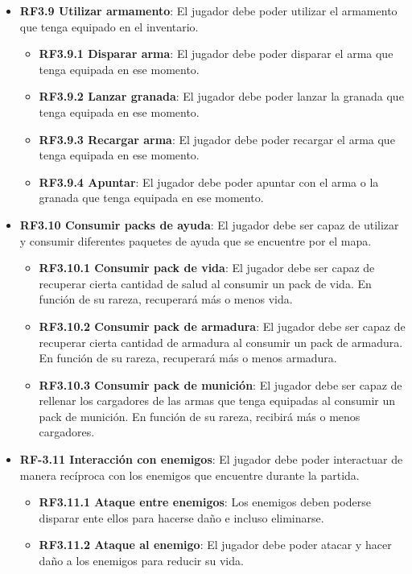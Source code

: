 \begin{itemize}
\begin{itemize}
        \item \textbf{RF3.9 Utilizar armamento}: El jugador debe poder utilizar el armamento que tenga equipado en el inventario.
        \begin{itemize}
            \item \textbf{RF3.9.1 Disparar arma}: El jugador debe poder disparar el arma que tenga equipada en ese momento.
            \item \textbf{RF3.9.2 Lanzar granada}: El jugador debe poder lanzar la granada que tenga equipada en ese momento.
            \item \textbf{RF3.9.3 Recargar arma}: El jugador debe poder recargar el arma que tenga equipada en ese momento.
            \item \textbf{RF3.9.4 Apuntar}: El jugador debe poder apuntar con el arma o la granada que tenga equipada en ese momento.
        \end{itemize}
        \item \textbf{RF3.10 Consumir packs de ayuda}: El jugador debe ser capaz de utilizar y consumir diferentes paquetes de ayuda que se encuentre por el mapa.
        \begin{itemize}
            \item \textbf{RF3.10.1 Consumir pack de vida}: El jugador debe ser capaz de recuperar cierta cantidad de salud al consumir un pack de vida. En función de su rareza, recuperará más o menos vida.
            \item \textbf{RF3.10.2 Consumir pack de armadura}: El jugador debe ser capaz de recuperar cierta cantidad de armadura al consumir un pack de armadura. En función de su rareza, recuperará más o menos armadura.
            \item \textbf{RF3.10.3 Consumir pack de munición}: El jugador debe ser capaz de rellenar los cargadores de las armas que tenga equipadas al consumir un pack de munición. En función de su rareza, recibirá más o menos cargadores.
        \end{itemize}
        \item \textbf{RF-3.11 Interacción con enemigos}: El jugador debe poder interactuar de manera recíproca con los enemigos que encuentre durante la partida.
        \begin{itemize}
            \item \textbf{RF3.11.1 Ataque entre enemigos}: Los enemigos deben poderse disparar ente ellos para hacerse daño e incluso eliminarse.
            \item \textbf{RF3.11.2 Ataque al enemigo}: El jugador debe poder atacar y hacer daño a los enemigos para reducir su vida.

\end{itemize}
\end{itemize}
\end{itemize}
